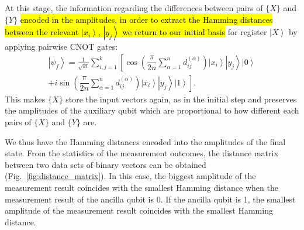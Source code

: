 \documentclass[pra,showkeys,twocolumn,showpacs]{revtex4-1}
\begin{document}
At this stage, the information regarding the differences between pairs of $\{X\}$ and $\{Y\}$ \hl{encoded in the amplitudes, in order to extract the Hamming distances between the relevant $\left| x_i \right\rangle$, $\left| y_j \right\rangle$ we return to our initial basis} for register $\left| X \right\rangle$ by applying pairwise CNOT gates:
%
\begin{multline}
    \left| \psi_f \right\rangle =  
    \frac{1}{\sqrt{kl}}\sum\limits_{i, j=1}^{k} 
	\left[ 
	    \cos\left(
	        \dfrac{\pi}{2n}
	        \sum\limits_{\alpha=1}^n d^{(\alpha)}_{ij} 
	    \right)
        \left| x_i \right\rangle 
        \left| y_j \right\rangle 
        \left| 0 \right\rangle\right.
        \\+
        \left. i \sin\left(
            \dfrac{\pi}{2n}
            \sum\limits_{\alpha=1}^n d^{(\alpha)}_{ij} 
        \right)
        \left| x_i \right\rangle 
        \left| y_j \right\rangle 
        \left| 1 \right\rangle
    \right] .
\end{multline}
%
This makes $\{X\}$ store the input vectors again, as in the initial step 
and preserves the amplitudes of the auxiliary qubit which are proportional to how different each pairs of $\{X\}$ and $\{Y\}$ are.

We thus have the Hamming distances encoded into the amplitudes of the final state. 
From the statistics of the measurement outcomes, the distance matrix between two data sets of binary vectors can be obtained (Fig.~\ref{fig:distance_matrix}). 
In this case, the biggest amplitude of the measurement result coincides with the smallest Hamming distance when the measurement result of the ancilla qubit is 0. 
If the ancilla qubit is 1, the smallest amplitude of the measurement result coincides with the smallest Hamming distance.  
\end{document}
